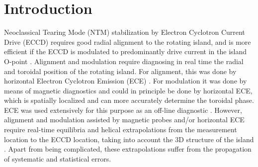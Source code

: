 \documentclass[aps,pra,twocolumn]{revtex4}
\begin{document}
\pacs{}

\maketitle



\section{Introduction} 
Neoclassical Tearing Mode (NTM) stabilization by  Electron Cyclotron
Current Drive (ECCD) requires good radial alignment  to the rotating
island, and is more efficient if the ECCD is modulated to
predominantly drive current in the  island O-point \cite{Rob_Rev}.
Alignment and modulation require diagnosing in real time  the radial
and toroidal position of the rotating island.  For alignment, this was
done by horizontal Electron Cyclotron  Emission (ECE) \cite{JT60-03,
  FTU}.  For modulation it was done by means of magnetic diagnostics
\cite{Marasch} and could in principle be done by horizontal ECE, which
is  spatially localized and can more accurately determine the toroidal
phase.  ECE was used extensively for this purpose as an off-line
diagnostic  \cite{TFTR-96, JT60-99, AUG-01, TEXTOR-03}.  However,
alignment and modulation assisted by magnetic probes and/or
horizontal ECE require real-time equilibria and helical extrapolations
from the measurement location to the  ECCD location,  taking into
account the 3D structure of the island \cite{Marasch, JT60-03}.  Apart
from being complicated, these extrapolations suffer from the
propagation  of systematic and statistical errors. 
\end{document}
